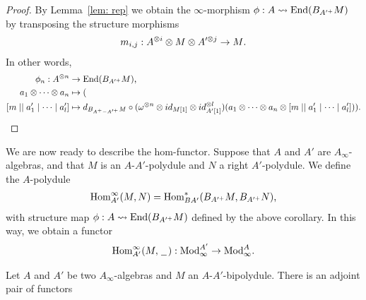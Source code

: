 \documentclass[../thesis.tex]{subfiles}
\begin{document}
            \begin{proof}
                By Lemma~\ref{lem: rep} we obtain the $\infty$-morphism $\phi : A \rightsquigarrow \tt{End}(B_{A'^+}M)$ by transposing the structure morphisms
                \begin{align*}
                    m_{i,j} : A^{\otimes i} \otimes M \otimes A'^{\otimes j} \rightarrow M\tt{.}
                \end{align*}
                In other words,
                \begin{align*}
                    \phi_n : A^{\otimes n} & \rightarrow \tt{End}(B_{A'^+}M)\tt{,} \\
                    a_1 \otimes \cdots \otimes a_n & \mapsto (\\
                    [m \mid\mid a'_1 \mid \cdots \mid a'_l] & \mapsto d_{B_{A^+-A'^+}M}\circ (\omega^{\otimes n}\otimes id_{M[1]} \otimes id_{A'[1]}^{\otimes l}) (a_1 \otimes \cdots \otimes a_n \otimes [m \mid\mid a'_1 \mid \cdots \mid a'_l]))\tt{.}
                \end{align*}
            \end{proof}

            We are now ready to describe the hom-functor. Suppose that $A$ and $A'$ are $A_\infty$-algebras, and that $M$ is an $A$-$A'$-polydule and $N$ a right $A'$-polydule. We define the $A$-polydule
            \begin{align*}
                \tt{Hom}^\infty_{A'}(M,N) = \tt{Hom}_{BA'}^*(B_{A'^+}M,B_{A'^+}N)\tt{,}
            \end{align*}
            with structure map $\phi : A \rightsquigarrow \tt{End}(B_{A'^+}M)$ defined by the above corollary. In this way, we obtain a functor
            \begin{align*}
                \tt{Hom}^\infty_{A'}(M,\argument) : \tt{Mod}_\infty^{A'} \rightarrow \tt{Mod}_\infty^A\tt{.}
            \end{align*}

            \begin{lemma}
                Let $A$ and $A'$ be two $A_\infty$-algebras and $M$ an $A$-$A'$-bipolydule. There is an adjoint pair of functors
                \begin{center}
                \end{center}
            \end{lemma}
\end{document}

